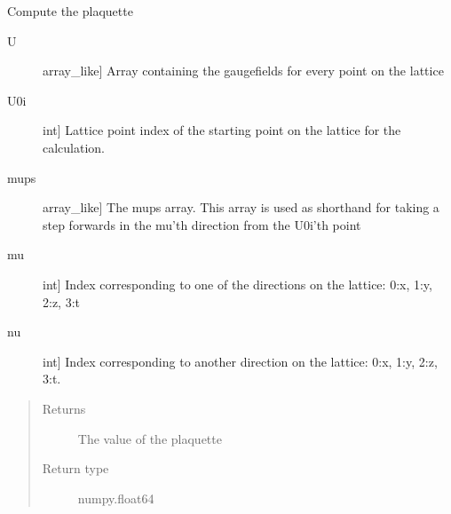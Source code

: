 \documentclass[letterpaper,10pt,english]{sphinxmanual}
\begin{document}

\begin{fulllineitems}
\label{\detokenize{index:su2.plaq}}
Compute the plaquette
\begin{description}
\item[{U}] \leavevmode{[}array\_like{]}
Array containing the gaugefields for every point on the lattice

\item[{U0i}] \leavevmode{[}int{]}
Lattice point index of the starting point on the lattice for
the calculation.

\item[{mups}] \leavevmode{[}array\_like{]}
The mups array. This array is used as shorthand for taking a
step forwards in the mu’th direction from the U0i’th point

\item[{mu}] \leavevmode{[}int{]}
Index corresponding to one of the directions on the lattice:
0:x, 1:y, 2:z, 3:t

\item[{nu}] \leavevmode{[}int{]}
Index corresponding to another direction on the lattice:
0:x, 1:y, 2:z, 3:t.

\end{description}
\begin{quote}\begin{description}
\item[{Returns}] \leavevmode
The value of the plaquette

\item[{Return type}] \leavevmode
numpy.float64

\end{description}\end{quote}

\end{fulllineitems}

\end{document}
